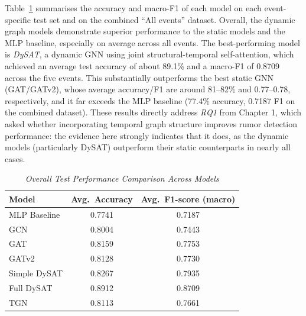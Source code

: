 \documentclass{cshonours}
\begin{document}
Table~\ref{tab:performance_summary} summarises the accuracy and macro-F1 of each model on each event-specific test set and on the combined ``All events'' dataset. Overall, the dynamic graph models demonstrate superior performance to the static models and the MLP baseline, especially on average across all events. The best-performing model is \emph{DySAT}, a dynamic GNN using joint structural-temporal self-attention, which achieved an average test accuracy of about 89.1\% and a macro-F1 of 0.8709 across the five events. This substantially outperforms the best static GNN (GAT/GATv2), whose average accuracy/F1 are around 81--82\% and 0.77--0.78, respectively, and it far exceeds the MLP baseline (77.4\% accuracy, 0.7187 F1 on the combined dataset). These results directly address \emph{RQ1} from Chapter 1, which asked whether incorporating temporal graph structure improves rumor detection performance: the evidence here strongly indicates that it does, as the dynamic models (particularly DySAT) outperform their static counterparts in nearly all cases.

\begin{table}[ht]
\centering
\caption{\textit{Overall Test Performance Comparison Across Models}}
\label{tab:performance_summary}
\begin{tabular}{lcc}
\toprule
\textbf{Model}       & \textbf{Avg.\ Accuracy} & \textbf{Avg.\ F1-score (macro)} \\
\midrule
MLP Baseline         & 0.7741                  & 0.7187                         \\
GCN                  & 0.8004                  & 0.7443                         \\
GAT                  & 0.8159                  & 0.7753                         \\
GATv2                & 0.8128                  & 0.7730                         \\
Simple DySAT         & 0.8267                  & 0.7935                         \\
Full DySAT           & 0.8912                  & 0.8709                         \\
TGN                  & 0.8113                  & 0.7661                         \\
\bottomrule
\end{tabular}
\end{table}
\end{document}
